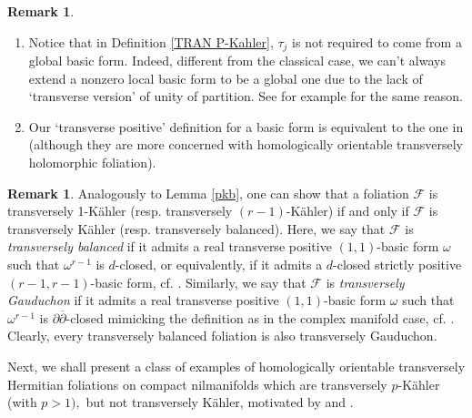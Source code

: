\documentclass[12pt]{amsart}
\numberwithin{equation}{section}
\theoremstyle{definition}
\theoremstyle{definition}
\theoremstyle{definition}
\newtheorem{remark}  [theorem]     {Remark}
\renewcommand{\1}{\mathsf{1}}
\renewcommand{\>}{\rightarrow}
\newcommand{\p}{\partial}
\newcommand{\bp}{\overline\partial}
\def\p{\partial}
\def\mc{\mathcal}
\theoremstyle{plain} %
\theoremstyle{plain} %
\theoremstyle{plain} %
\begin{document}
	\begin{remark}
		\begin{enumerate}
			\item Notice that  in Definition \ref{TRAN P-Kahler},  $\tau_j$  is not  required to come from a  global basic form. Indeed, different from the classical case, we can't always extend a nonzero local basic form to be a global one due to the lack of `transverse version' of unity of partition. See for example \cite[Definition of the degree of a transversely Hermitian vector bundle (1.3)]{BH22} for the same reason.
			\item Our `transverse positive' definition for a basic form is equivalent to the one  in \cite[p. 8]{ZZ21} (although they are more concerned with homologically orientable transversely holomorphic foliation).
		\end{enumerate}
	\end{remark}
	
	
	
	\begin{remark}\label{nvwa}
		Analogously to Lemma \ref{pkb}, one can show that a foliation $\mc F$ is transversely 1-K\"ahler (resp. transversely $(r-1)$-K\"ahler) if and only if $\mc F$ is transversely K\"ahler (resp. transversely balanced). Here, we say that $\mathcal{F}$ is \emph{transversely balanced} if it admits a real transverse positive $(1,1)$-basic form $\omega$ such that $\omega^{r-1}$ is $d$-closed, or equivalently, if it admits a $d$-closed strictly positive $(r-1,r-1)$-basic form, cf. \cite[(4.8)]{Mich}. Similarly, we say that $\mathcal{F}$ is \emph{transversely Gauduchon}  if it admits a real transverse positive $(1,1)$-basic form $\omega$ such that $\omega^{r-1}$ is $\p\bp$-closed mimicking the definition as in the complex manifold case, cf. \cite{Ga77}. Clearly, every transversely balanced foliation is
		also transversely Gauduchon.
	\end{remark}
	
	Next, we shall present a class of examples of homologically orientable transversely Hermitian foliations on compact nilmanifolds which are transversely $p$-K\"ahler (with $p>1),$ but not transversely K\"ahler, motivated by \cite{CW90} and \cite{AB91}.
	
\end{document}
